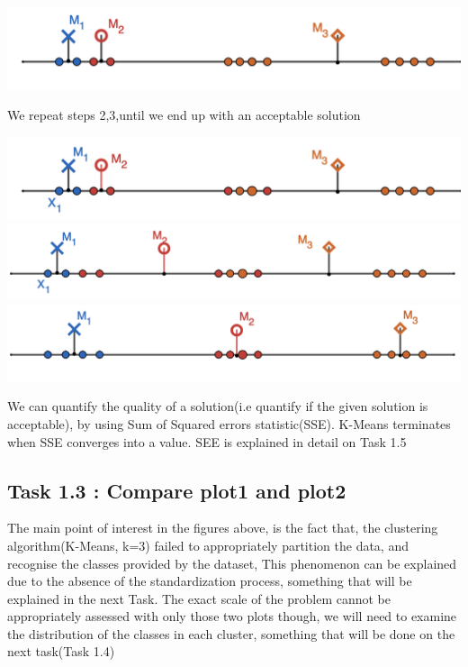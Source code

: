 \documentclass[11pt]{article}
\begin{document}
				\iftrue
				\begin{center}
					\includegraphics[scale=0.5]{res/t1/t12/t12-kmeans-5}
				\end{center}
				\fi
				We repeat steps 2,3,until we end up with an acceptable solution
				\iftrue
				\begin{center}
					\includegraphics[scale=0.5]{res/t1/t12/t12-kmeans-6}
					\includegraphics[scale=0.5]{res/t1/t12/t12-kmeans-7}
					\includegraphics[scale=0.5]{res/t1/t12/t12-kmeans-8}
				\end{center}
				\fi
				We can quantify the quality of a solution(i.e quantify if the given solution is acceptable), by using Sum of Squared errors statistic(SSE). K-Means terminates when SSE converges into a value. SEE is explained in detail on Task 1.5
				
		 \subsection*{Task 1.3 : Compare plot1 and plot2}
			The main point of interest in the figures above, is the fact that, the clustering algorithm(K-Means, k=3) failed to appropriately partition the data, and recognise the classes provided by the dataset, This phenomenon can be explained due to the absence of the standardization process, something that will be explained in the next Task. The exact scale of the problem cannot be appropriately assessed with only those two plots though, we will need to examine the distribution of the classes in each cluster, something that will be done on the next task(Task 1.4)
		
\end{document}
